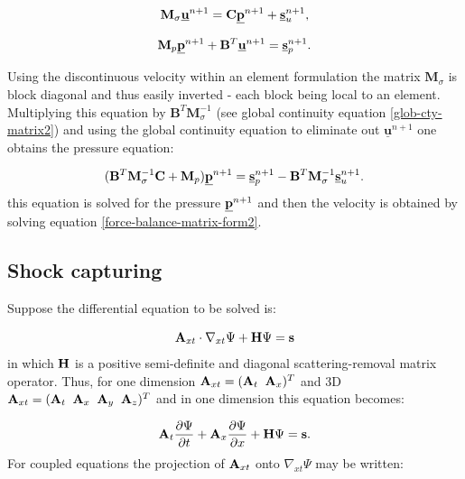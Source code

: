 \begin{equation}
{\mathbf M}_\sigma  \underline{\bf u}^{n+1} = {\mathbf C} \underline{\bf p}^{n+1} + \underline{\bf s}_u^{n+1},
\label{force-balance-matrix-form2}
\end{equation}

\begin{equation}
{\mathbf M}_p \underline{\bf p}^{n+1} + {\mathbf B}^T \underline{\bf u}^{n+1} = \underline{\bf s}_p^{n+1}.
\label{glob-cty-matrix2}
\end{equation}

Using the discontinuous velocity within an element
formulation the matrix ${\mathbf M}_\sigma$ is block diagonal
and thus easily inverted - each block being local to an element.
Multiplying this equation by ${\mathbf B}^T {\mathbf M}_\sigma^{-1}$
(see global continuity
equation \ref{glob-cty-matrix2}) and using the global continuity
equation to eliminate out $ \underline{\mathbf u}^{n+1} $ one obtains
the pressure equation:

\begin{equation}
({\mathbf B}^T {\mathbf M}_\sigma^{-1} {\mathbf C} + {\mathbf M}_p) \underline{\bf p}^{n+1}
=  \underline{\bf s}_p^{n+1}
- {\mathbf B}^T {\mathbf M}_\sigma^{-1}\underline{\bf s}_u^{n+1}.
\end{equation}
this equation is solved for the pressure  $\underline{\bf p}^{n+1}$ and then
the
velocity is obtained by solving
equation \ref{force-balance-matrix-form2}.



\subsection{Shock capturing}
\label{shock}

Suppose the differential equation to be solved is:

\begin{equation}
{\bf A}_{xt} \cdot {\nabla_{xt}} \Psi
+ {\bf H} \Psi ={\bf s}
\label{differential-eqn-def-matrix-compact}
\end{equation}
in which ${\bf H}$ is a positive semi-definite and diagonal
scattering-removal matrix operator.
Thus, for one dimension ${\bf A}_{xt}=({\bf A}_t \;\; {\bf A}_x)^T$ and 3D
${\bf A}_{xt}=({\bf A}_t \;\; {\bf A}_x\;\; {\bf A}_y\;\; {\bf A}_z)^T$ and in
one dimension this equation becomes:

\begin{equation}
 {\bf A}_t \frac{\partial \Psi}{\partial t} +
{\bf A}_x \frac{\partial \Psi}{\partial x}
+ {\bf H} \Psi ={\bf s}.
\label{differential-eqn-def-matrix}
\end{equation}
For coupled equations
the projection of ${\bf A}_{xt}$ onto ${\nabla_{xt}} \Psi$ may be written:


